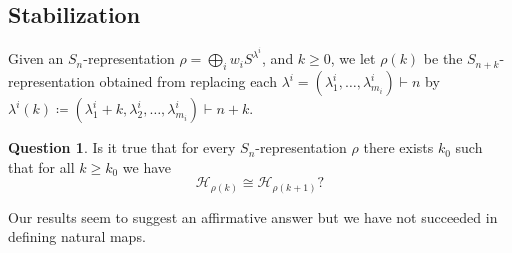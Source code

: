 \documentclass[11pt]{amsart}
\theoremstyle{definition}
\newtheorem{question}[theorem]{Question}
\newcommand{\HH}{\mathcal{H}}
\begin{document}
\subsection{Stabilization}\label{subsec:stabilization}
Given an $S_n$-representation $\rho = \bigoplus_{i} w_i S^{\lambda^i}$, and $k \geq 0$, we let $\rho(k)$ be the $S_{n+k}$-representation obtained from replacing each $\lambda^i = (\lambda^i_1,\ldots,\lambda^i_{m_i}) \vdash n$ by $\lambda^i(k) \coloneqq (\lambda^i_1 + k, \lambda^i_2,\ldots,\lambda^i_{m_i}) \vdash n+k$.

\begin{question}\label{question:stabilization}
    Is it true that for every $S_n$-representation $\rho$ there exists $k_0$ such that for all $k \geq k_0$ we have
    \begin{equation*}
        \HH_{\rho(k)} \cong \HH_{\rho(k+1)}?
    \end{equation*}
\end{question}

Our results seem to suggest an affirmative answer but we have not succeeded in defining natural maps.






\end{document}
